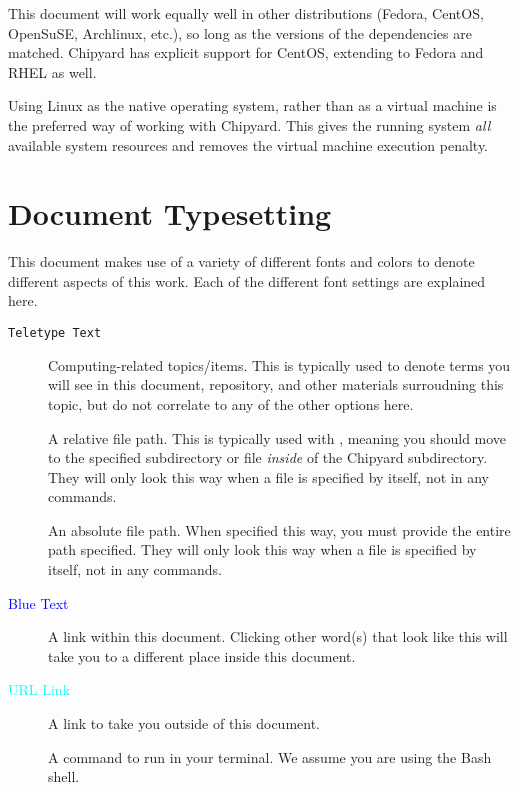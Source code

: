 This document will work equally well in other distributions (Fedora, CentOS, OpenSuSE, Archlinux, etc.), so long as the versions of the dependencies are matched.
Chipyard has explicit support for CentOS, extending to Fedora and RHEL as well.

Using Linux as the native operating system, rather than as a virtual machine is the preferred way of working with Chipyard.
This gives the running system \emph{all} available system resources and removes the virtual machine execution penalty.

\section{Document Typesetting}\label{sec:Doc_Typesetting}
This document makes use of a variety of different fonts and colors to denote different aspects of this work.
Each of the different font settings are explained here.

\begin{description}
\item[\texttt{Teletype Text}] Computing-related topics/items.
  This is typically used to denote terms you will see in this document, repository, and other materials surroudning this topic, but do not correlate to any of the other options here.
\item[] A relative file path.
  This is typically used with , meaning you should move to the specified subdirectory or file \emph{inside} of the Chipyard subdirectory.
  They will only look this way when a file is specified by itself, not in any commands.
\item[] An absolute file path.
  When specified this way, you must provide the entire path specified.
  They will only look this way when a file is specified by itself, not in any commands.
\item[\textnormal{\textcolor{blue}{Blue Text}}] A link within this document.
  Clicking other word(s) that look like this will take you to a different place inside this document.
\item[\textnormal{\textcolor{cyan}{URL Link}}] A link to take you outside of this document.
\item[] A command to run in your terminal.
  We assume you are using the Bash shell.
\end{description}


